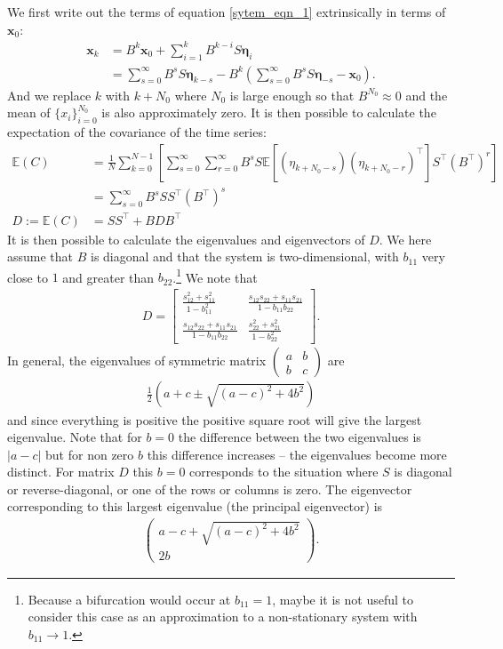 \documentclass[11pt,a4paper,reqno]{article}
\numberwithin{equation}{section}
\newcommand{\x}{{\mathbf x}}
\newcommand{\etab}{{\mathbf \eta}}
\begin{document}
We first write out the terms of equation \ref{sytem_eqn_1} extrinsically in terms of $\x_0$:
\begin{align}
\x_k &= B^k\x_0 + \sum_{i=1}^{k} B^{k-i}S\etab_i \\
&= \sum_{s=0}^{\infty} B^{s} S \etab_{k-s} - B^k \left(\sum_{s=0}^{\infty} B^{s} S \etab_{-s} - \x_0\right).
\end{align}
And we replace $k$ with $k+N_0$ where $N_0$ is large enough so that $B^{N_0} \approx 0$ and the mean of $\{x_i\}_{i=0}^{N_0}$ is also approximately zero. It is then possible to calculate the expectation of the covariance of the time series:
\begin{align}
\mathbb{E}(C) &= \frac{1}{N}\sum_{k=0}^{N-1}\left[\sum_{s=0}^\infty \sum_{r=0}^\infty B^s S\mathbb{E}\left[(\eta_{k+N_0-s})(\eta_{k+N_0-r})^\top\right] S^\top (B^\top)^r\right]\\
& = \sum_{s=0}^\infty B^s S S^\top (B^\top)^s \\
D :=\mathbb{E}(C) &= SS^\top + B D B^\top
\end{align}
It is then possible to calculate the eigenvalues and eigenvectors of $D$. We here assume that $B$ is diagonal and that the system is two-dimensional, with $b_{11}$ very close to $1$ and greater than $b_{22}$.\footnote{Because a bifurcation would occur at $b_{11}=1$, maybe it is not useful to consider this case as an approximation to a non-stationary system with $b_{11}\rightarrow 1$.} We note that 
\begin{align}
D = \left[ 
\begin{array}{cc}
\frac{s_{12}^2+s_{11}^2}{1-b_{11}^2} & \frac{s_{12}s_{22}+s_{11}s_{21}}{1-b_{11}b_{22}}\\
\frac{s_{12}s_{22}+s_{11}s_{21}}{1-b_{11}b_{22}} & \frac{s_{22}^2+s_{21}^2}{1-b_{22}^2}
\end{array}
\right].
\label{D_for_B_diag}
\end{align}
In general, the eigenvalues of symmetric matrix 
\(
\left(
\begin{array}{cc}
a&b\\
b&c
\end{array}
\right)
\)
are 
\begin{align}
\frac{1}{2}\left(a+c\pm\sqrt{(a-c)^2+4b^2}\right)
\label{general_eigenvalues}
\end{align}
and since everything is positive the positive square root will give the largest eigenvalue. Note that for $b=0$ the difference between the two eigenvalues is $|a-c|$ but for non zero $b$ this difference increases -- the eigenvalues become more distinct. For matrix $D$ this $b=0$ corresponds to the situation where $S$ is diagonal or reverse-diagonal, or one of the rows or columns is zero. The eigenvector corresponding to this largest eigenvalue (the principal eigenvector) is
\begin{align}
\left(
\begin{array}{c}
a-c + \sqrt{(a-c)^2+4b^2}\\
2b
\end{array}
\right).
\label{largest_eigenvector}
\end{align}
\end{document}
